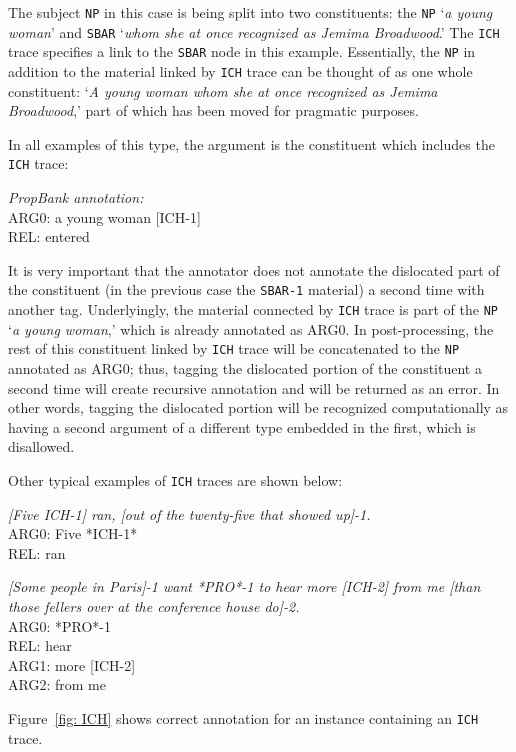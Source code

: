 \documentclass[11pt]{report}
\begin{document}
The subject \texttt{NP} in this case is being split into two constituents: the \texttt{NP} `\textit{a young woman}' and \texttt{SBAR} `\textit{whom she at once recognized as Jemima Broadwood}.' The \texttt{ICH} trace specifies a link to the \texttt{SBAR} node in this example.  Essentially, the \texttt{NP} in addition to the material linked by \texttt{ICH} trace can be thought of as one whole constituent: `\textit{A young woman whom she at once recognized as Jemima Broadwood},' part of which has been moved for pragmatic purposes. 

In all examples of this type, the argument is the constituent which includes the \texttt{ICH} trace:  

\textit{PropBank annotation:}\\
ARG0: a young woman [ICH-1]\\
REL:  entered
 
 It is very important that the annotator does not annotate the dislocated part of the constituent (in the previous case the \texttt{SBAR-1} material) a second time with another tag.  Underlyingly, the material connected by \texttt{ICH} trace is part of the \texttt{NP} `\textit{a young woman},' which is already annotated as ARG0.  In post-processing, the rest of this constituent linked by \texttt{ICH} trace will be concatenated to the \texttt{NP} annotated as ARG0; thus, tagging the dislocated portion of the constituent a second time will create recursive annotation and will be returned as an error.  In other words, tagging the dislocated portion will be recognized computationally as having a second argument of a different type embedded in the first, which is disallowed.  

Other typical examples of \texttt{ICH} traces are shown below:

\textit{[Five ICH-1] ran, [out of the twenty-five that showed up]-1.}\\
ARG0:        Five *ICH-1*\\
REL:            ran

\textit{[Some people in Paris]-1 want *PRO*-1 to hear more [ICH-2] from me [than those fellers over at the conference house do]-2.}\\
ARG0: *PRO*-1\\
REL:	hear\\
ARG1:  more [ICH-2]\\
ARG2:  from me
	
Figure~\ref{fig: ICH} shows correct annotation for an instance containing an \texttt{ICH} trace.  
\end{document}
